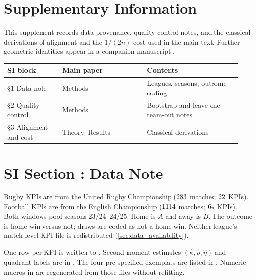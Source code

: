 \clearpage
\setcounter{figure}{0}
\renewcommand{\thefigure}{S\arabic{figure}}
\setcounter{table}{0}
\renewcommand{\thetable}{S\arabic{table}}

\section*{Supplementary Information}

\noindent This supplement records data provenance, quality-control notes, and the classical derivations of alignment and the $1/(2n)$ cost used in the main text.
Further geometric identities appear in a companion manuscript \parencite{pefstatistics2026}.

\medskip
\noindent\begin{tabular}{@{}p{0.22\linewidth}p{0.34\linewidth}p{0.38\linewidth}@{}}
  \toprule
  \textbf{SI block} & \textbf{Main paper} & \textbf{Contents} \\
  \midrule
  \S1 Data note & Methods & Leagues, seasons, outcome coding \\
  \S2 Quality control & Methods & Bootstrap and leave-one-team-out notes \\
  \S3 Alignment and cost & Theory; Results & Classical derivations \\
  \bottomrule
\end{tabular}

\clearpage

\section*{SI Section \thesisection: Data Note}
\label{sec:si_data}

\noindent Rugby KPIs are from the United Rugby Championship ($283$ matches; $22$ KPIs).
Football KPIs are from the English Championship ($1114$ matches; $64$ KPIs).
Both windows pool seasons 23/24--24/25.
Home is $A$ and away is $B$.
The outcome is home win versus not; draws are coded as not a home win.
Neither league's match-level KPI file is redistributed (\cref{sec:data_availability}).

One row per KPI is written to .
Second-moment estimates $(\hat\kappa,\hat\rho,\hat\eta)$ and quadrant labels are in .
The four pre-specified exemplars are listed in .
Numeric macros in  are regenerated from those files without refitting.

